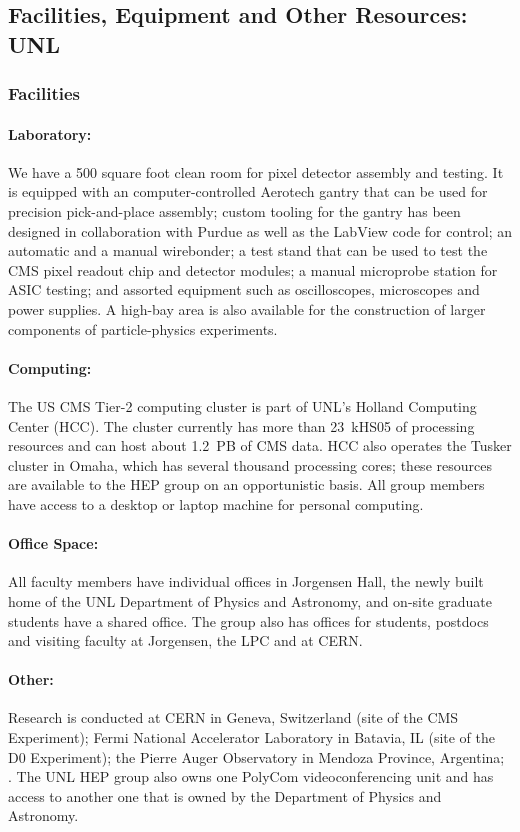 \subsection{Facilities, Equipment and Other Resources: UNL}
\subsubsection{Facilities}
\paragraph{Laboratory:} We have a 500 square foot clean room for pixel detector
assembly and testing.  It is equipped with an computer-controlled
Aerotech gantry that can be used for precision pick-and-place
assembly; custom tooling for the gantry has been designed in
collaboration with Purdue as well as the LabView code for control; an
automatic and a manual wirebonder; a test stand that can be used to
test the CMS pixel readout chip and detector modules; a manual
microprobe station for ASIC testing; and assorted equipment such as
oscilloscopes, microscopes and power supplies.  A high-bay area is
also available for the construction of larger components of
particle-physics experiments.

\paragraph{Computing:} The US CMS Tier-2 computing cluster is part of UNL's
Holland Computing Center (HCC).  The cluster currently has more than
23~kHS05 of processing resources and can host about 1.2~PB of CMS data.
HCC also operates the Tusker cluster in Omaha, which has several thousand
processing cores; these resources are available to the HEP group on an
opportunistic basis.  All group members have access to a desktop or laptop
machine for personal computing.

\paragraph{Office Space:} All faculty members have individual offices in Jorgensen
Hall, the newly built home of the UNL Department of Physics and Astronomy, and on-site
graduate students have a shared office.  The group also has offices for
students, postdocs and visiting faculty at Jorgensen, the LPC and at
CERN.

\paragraph{Other:} Research is conducted at CERN in Geneva, Switzerland (site of
the CMS Experiment); Fermi National Accelerator Laboratory in Batavia, IL
(site of the D0 Experiment); the Pierre Auger Observatory in Mendoza
Province, Argentina; .  The UNL
HEP group also owns one PolyCom videoconferencing unit and has access to
another one that is owned by the Department of Physics and Astronomy.

